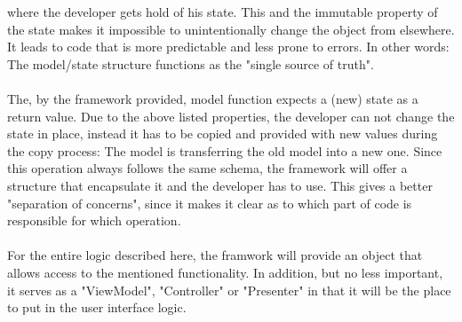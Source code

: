 where the developer gets hold of his state. This and the immutable property of the state makes it impossible to unintentionally change the object from elsewhere. It leads 
to code that is more predictable and less prone to errors. In other words: The model/state structure functions as the "single source of truth".
\\
\\
The, by the framework provided, model function expects a (new) state as a return value. Due to the above listed properties, the developer can not change the state 
in place, instead it has to be copied and provided with new values during the copy process: The model is transferring the old model into a new one.
Since this operation always follows the same schema, the framework will offer a structure that encapsulate it and the developer has to use.
This gives a better "separation of concerns", since it makes it clear as to which part of code is responsible for which operation.
\\
\\
For the entire logic described here, the framwork will provide an object that allows access to the mentioned functionality. In addition, but no less important, 
it serves as a "ViewModel", "Controller" or "Presenter" in that it will be the place to put in the user interface logic.


